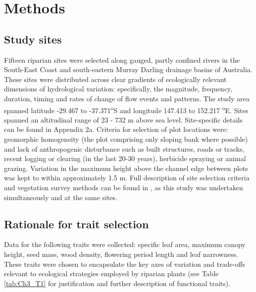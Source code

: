 \documentclass[openright,12pt,a4paper]{memoir}
\begin{document}
\section{Methods}
\subsection{Study sites}
Fifteen riparian sites were selected along gauged, partly confined rivers in the South-East Coast and south-eastern Murray Darling drainage basins of Australia. These sites were distributed across clear gradients of ecologically relevant dimensions of hydrological variation: specifically, the magnitude, frequency, duration, timing and rates of change of flow events and patterns. The study area spanned latitude -29.467 to -37.371\textsuperscript {o}S and longitude 147.413 to 152.217 \textsuperscript{o}E. Sites spanned an altitudinal range of 23 - 732 m above sea level. Site-specific details can be found in Appendix 2a. Criteria for selection of plot locations were: geomorphic homogeneity (the plot comprising only sloping bank where possible) and lack of anthropogenic disturbance such as built structures, roads or tracks, recent logging or clearing (in the last 20-30 years), herbicide spraying or animal grazing. Variation in the maximum height above the channel edge between plots was kept to within approximately 1.5 m. Full description of site selection criteria and vegetation survey methods can be found in \citep{Lawson2015}, as this study was undertaken simultaneously and at the same sites. 

\subsection{Rationale for trait selection}
Data for the following traits were collected: specific leaf area, maximum canopy height, seed mass, wood density, flowering period length and leaf narrowness. These traits were chosen to encapsulate the key axes of variation and trade-offs relevant to ecological strategies employed by riparian plants (see Table \ref{tab:Ch3_T1} for justification and further description of functional traits).
\end{document}
